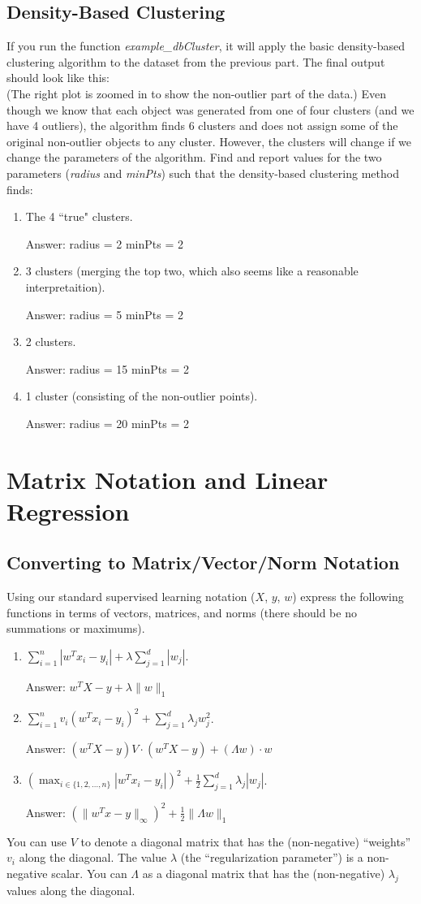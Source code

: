 \documentclass{article}
\def\ans#1{\par\gre{Answer: #1}}
\def\blu#1{{\color{blu}#1}}
\def\gre#1{{\color{gre}#1}}
\def\half{\frac 1 2}
\newcommand{\fig}[2]{\texttt{[image: a3f/\#2]}}
\def\enum#1{\begin{enumerate}#1\end{enumerate}}
\begin{document}
\subsection{Density-Based Clustering}

If you run the function \emph{example\_dbCluster}, it will apply the basic density-based clustering algorithm to the dataset from the previous part. The final output should look like this:\\
(The right plot is zoomed in to show the non-outlier part of the data.)
Even though we know that each object was generated from one of four clusters (and we have 4 outliers), the algorithm finds 6 clusters and does not assign some of the original non-outlier objects to any cluster. However, the clusters will change if we change the parameters of the algorithm. Find and report values for the two parameters (\emph{radius} and \emph{minPts}) such that the density-based clustering method finds:
\blu{\enum{
\item The 4 ``true" clusters. \ans{radius = 2
minPts = 2}
\item 3 clusters (merging the top two, which also seems like a reasonable interpretaition). \ans{radius = 5
minPts = 2}
\item 2 clusters. \ans{radius = 15
minPts = 2}
\item 1 cluster (consisting of the non-outlier points).\ans{radius = 20
minPts = 2}
}}





\section{Matrix Notation and Linear Regression}

\subsection{Converting to Matrix/Vector/Norm Notation}

Using our standard supervised learning notation ($X$, $y$, $w$)
express the following functions in terms of vectors, matrices, and norms (there should be no summations or maximums).
\blu{\enum{
\item $\sum_{i=1}^n  |w^Tx_i - y_i| + \lambda \sum_{j=1}^{d} |w_j|$. \ans{$w^TX - y + \lambda \|w\|_1$}
\item $\sum_{i=1}^n v_i (w^Tx_i - y_i)^2 + \sum_{j=1}^{d} \lambda_j w_j^2$. \ans{$ (w^TX-y)V \cdot (w^TX-y) + (\Lambda w) \cdot w$}
\item $\left(\max_{i \in \{1,2,\dots,n\}} |w^Tx_i - y_i|\right)^2 +  \half\sum_{j=1}^{d} \lambda_j|w_j|$.  \ans{$(\|w^Tx-y\| _{\infty})^2 + \frac{1}{2} \|\Lambda w\|_1$}
}}
You can use $V$ to denote a diagonal matrix that has the (non-negative) ``weights'' $v_i$ along the diagonal. The value $\lambda$ (the ``regularization parameter'') is a non-negative scalar. You can $\Lambda$ as a diagonal matrix that has the (non-negative) $\lambda_j$ values along the diagonal.
\end{document}

